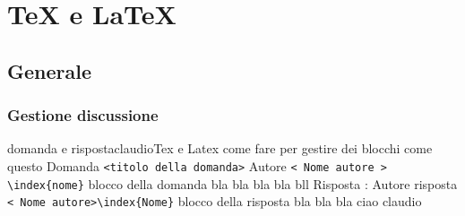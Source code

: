 \chapter{TeX e LaTeX}
\label{chap:texelatex}
\section{Generale}
\label{sec:Texgenerale}
\subsection{Gestione discussione}

\begin{domanda}{domanda e risposta}{claudio}{Tex e Latex}
come fare per gestire dei blocchi come questo
Domanda \verb!<titolo della domanda>! Autore \verb!< Nome autore >! \verb!\index{nome}!
blocco della domanda bla bla bla bla bll
Risposta : Autore risposta \verb!< Nome autore>\index{Nome}!
blocco della risposta bla bla bla
ciao
claudio 
\end{domanda}
